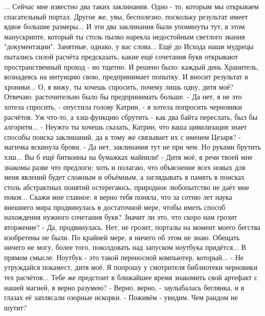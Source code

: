 ... Сейчас мне известно два таких заклинания. Одно - то, которым мы открываем спасательный портал. Другое же, увы, бесполезно, поскольку результат имеет вдвое большие размеры... И эти два заклинания были упомянуты тут, в этом манускрипте, который ты столь пылко нарекла недостойным светлого звания "документации". Занятные, однако, у вас слова... Ещё до Исхода наши мудрецы пытались силой расчёта предсказать, какие ещё сочетания букв открывают пространственный проход - но тщетно. И решено было: каждый день Хранитель, вознадеясь на интуицию свою, предпринимает попытку. И вносит результат в хроники... О, я вижу, ты хочешь спросить, почему лишь одну, дитя моё? Отвечаю: расточительно было бы предпринимать больше.
- Да нет, я не это хотела спросить, - опустила голову Катрин, - я хотела попросить черновики расчётов. Уж что-то, а хэш-функцию сбрутить - как два байта переслать, был бы алгоритм...
- Неужто ты хочешь сказать, Катрин, что ваша цивилизация знает способы поиска заклинаний, да к тому же связывает их с именем Цезаря? - магичка вскинула брови.
- Да нет, заклинания тут не при чем. Но руками брутить хэш... Вы б ещё биткоины на бумажках майнили!
- Дитя моё, в речи твоей мне знакомы разве что предлоги; хоть и полагаю, что объяснение всех новых для меня явлений будет сложным и объёмным, а заглядывать в память в поисках столь абстрактных понятий остерегаюсь, природное любопытство не даёт мне покоя... Скажи мне главное: я верно тебя поняла, что за сотню лет наука внешнего мира продвинулась в достаточной мере, чтобы иметь способ нахождения нужного сочетания букв? Значит ли это, что скоро нам грозит вторжение?
- Да, продвинулась. Нет, не грозит, порталы на момент моего бегства изобретены не были. По крайней мере, я ничего об этом не знаю. Обещать ничего не могу, более того, поколдовать над запуском ноутбука придётся... В прямом смысле. Ноутбук - это такой переносной компьютер, который...
- Не утруждайся покамест, дитя моё. Я попрошу у смотрителя библиотеки черновики тех расчётов... Тебе же предстоит в ближайшее время знакомить свой артефакт с нашей магией, я верно разумею?
- Верно, верно, - заулыбалась беглянка, и в глазах её заплясали озорные искорки. - Поживём - увидим. Чем рандом не шутит?
